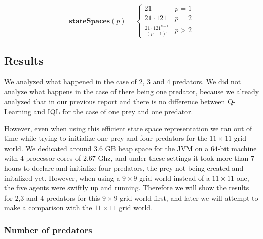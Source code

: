 \[
\mathbf{stateSpaces}(p) = 
\begin{cases}
	21 & p = 1\\
    21 \cdot 121 & p = 2 \\
    \frac{21\cdot 121^{p-1}}{(p-1)!}& p > 2
\end{cases}
\]


\subsection{Results}

We analyzed what happened in the case of 2, 3 and 4 predators.
We did not analyze what happens in the case of there being one predator, because we already analyzed that in our previous report and there is no difference between Q-Learning and IQL for the case of  one prey and one predator.

However, even when using this efficient state space representation we ran out of time while trying to initialize one prey and four predators for the $11 \times 11$ grid world. We dedicated around $3.6$ GB heap space for the JVM on a $64$-bit machine with $4$ processor cores of $2.67$ Ghz, and under these settings it took more than $7$ hours to declare and initialize four predators, the prey not being created and initalized yet.
However, when using a $9 \times 9$ grid world instead of a $11 \times 11$ one, the five agents were swiftly up and running. 
Therefore we will show the results for $2$,$3$ and $4$ predators for this $9 \times 9$
 grid world first, and later we will attempt to make a comparison with the $11 \times 11$ grid world.



\subsubsection{Number of predators}

